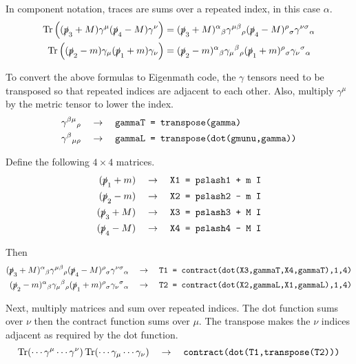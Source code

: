 \documentclass[12pt]{article}
\begin{document}
\bigskip
In component notation, traces are sums over a repeated index, in this case $\alpha$.
\begin{align*}
\mathop{\rm Tr}\left((\slashed{p}_3+M)\gamma^\mu(\slashed{p}_4-M)\gamma^\nu\right)
&=
(\slashed{p}_3+M)^\alpha{}_\beta
\gamma^{\mu\beta}{}_\rho
(\slashed{p}_4-M)^\rho{}_\sigma
\gamma^{\nu\sigma}{}_\alpha
\\
\mathop{\rm Tr}\left((\slashed{p}_2-m)\gamma_\mu(\slashed{p}_1+m)\gamma_\nu\right)
&=
(\slashed{p}_2-m)^\alpha{}_\beta
\gamma_\mu{}^\beta{}_\rho
(\slashed{p}_1+m)^\rho{}_\sigma
\gamma_\nu{}^\sigma{}_\alpha
\end{align*}

To convert the above formulas to Eigenmath code,
the $\gamma$ tensors need to be transposed
so that repeated indices are adjacent to each other.
Also, multiply $\gamma^\mu$ by the metric tensor to lower the index.
\begin{align*}
\gamma^{\beta\mu}{}_\rho\quad&\rightarrow\quad
\text{\tt gammaT = transpose(gamma)}\\
\gamma^\beta{}_{\mu\rho}\quad&\rightarrow\quad
\text{\tt gammaL = transpose(dot(gmunu,gamma))}
\end{align*}

Define the following $4\times4$ matrices.
\begin{align*}
(\slashed{p}_1+m)\quad&\rightarrow\quad\text{\tt X1 = pslash1 + m I}\\
(\slashed{p}_2-m)\quad&\rightarrow\quad\text{\tt X2 = pslash2 - m I}\\
(\slashed{p}_3+M)\quad&\rightarrow\quad\text{\tt X3 = pslash3 + M I}\\
(\slashed{p}_4-M)\quad&\rightarrow\quad\text{\tt X4 = pslash4 - M I}
\end{align*}

Then
\begin{align*}
(\slashed{p}_3+M)^\alpha{}_\beta
\gamma^{\mu\beta}{}_\rho
(\slashed{p}_4-M)^\rho{}_\sigma
\gamma^{\nu\sigma}{}_\alpha
\quad&\rightarrow\quad
\text{\tt T1 = contract(dot(X3,gammaT,X4,gammaT),1,4)}
\\
(\slashed{p}_2-m)^\alpha{}_\beta
\gamma_\mu{}^\beta{}_\rho
(\slashed{p}_1+m)^\rho{}_\sigma
\gamma_\nu{}^\sigma{}_\alpha
\quad&\rightarrow\quad
\text{\tt T2 = contract(dot(X2,gammaL,X1,gammaL),1,4)}
\end{align*}

Next, multiply matrices and sum over repeated indices.
The dot function sums over $\nu$ then the contract function
sums over $\mu$. The transpose makes the $\nu$ indices adjacent
as required by the dot function.
$$
\mathop{\rm Tr}(\cdots\gamma^\mu\cdots\gamma^\nu)\mathop{\rm Tr}(\cdots\gamma_\mu\cdots\gamma_\nu)
\quad\rightarrow\quad
\text{\tt contract(dot(T1,transpose(T2)))}
$$
\end{document}
